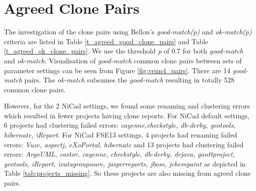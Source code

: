 \documentclass{IEEEtran}
\begin{document}
\newpage

\section*{Agreed Clone Pairs}
The investigation of the clone pairs using Bellon's \textit{good-match(p)} and \textit{ok-match(p)} criteria are listed in  Table \ref{t_agreed_good_clone_pairs} and Table \ref{t_agreed_ok_clone_pairs}. We use the threshold \textit{p} of 0.7 for both \textit{good-match} and \textit{ok-match}. Visualisation of \textit{good-match} common clone pairs between sets of parameter settings can be seen from Figure \ref{fig:venn4_pairs}. There are 14 \textit{good-match} pairs. The \textit{ok-match} subsumes the \textit{good-match} resulting in totally 528 common clone pairs.

However, for the 2 NiCad settings, we found some renaming and clustering errors which resulted in fewer projects having clone reports. For NiCad default settings, 6 projects had clustering failed errors: \textit{cayenne,checkstyle, db-derby, geotools, hibernate, iReport}. For NiCad FSE13 settings, 4 projects had renaming failed errors: \textit{Vuze, aspectj, eXoPortal, hibernate} and 13 projects had clustering failed errors: \textit{ArgoUML, castor, cayenne, checkstyle, db-derby, drjava, ganttproject, geotools, iReport, ivatagroupware, jasperreports, jboss, jchempaint} as depicted in Table \ref{tab:projects_missing}. So these projects are also missing from agreed clone pairs.
\end{document}
